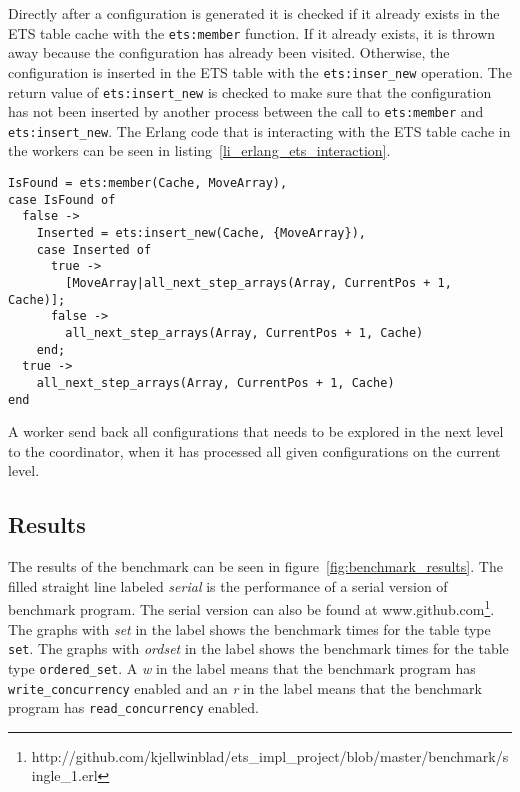 \documentclass[aps,pre,preprint,nofootinbib]{revtex4}
\begin{document}
    Directly after a configuration is generated it is checked if it already exists in the ETS table cache with the \verb|ets:member| function.
    If it already exists, it is thrown away because the configuration has already been visited.
    Otherwise, the configuration is inserted in the ETS table with the \verb|ets:inser_new| operation.
    The return value of \verb|ets:insert_new| is checked to make sure that the configuration has not been inserted by another process between the call to \verb|ets:member| and \verb|ets:insert_new|.
    The Erlang code that is interacting with the ETS table cache in the workers can be seen in listing~\ref{li_erlang_ets_interaction}.

    \lstset{language=erlang, caption=Worker code that is interacting with ETS, label=li_erlang_ets_interaction} 
\begin{lstlisting}[float=htb] 
IsFound = ets:member(Cache, MoveArray),
case IsFound of
  false ->
    Inserted = ets:insert_new(Cache, {MoveArray}),
    case Inserted of
      true ->
        [MoveArray|all_next_step_arrays(Array, CurrentPos + 1, Cache)];
      false ->
        all_next_step_arrays(Array, CurrentPos + 1, Cache)
    end;
  true ->
    all_next_step_arrays(Array, CurrentPos + 1, Cache)
end
\end{lstlisting}
    
    A worker send back all configurations that needs to be explored in the next level to the coordinator, when it has processed all given configurations on the current level.


\subsection{Results}

  The results of the benchmark can be seen in figure~\ref{fig:benchmark_results}.
  The filled straight line labeled \emph{serial} is the performance of a serial version of benchmark program.
  The serial version can also be found at www.github.com\footnote{http://github.com/kjellwinblad/ets\_impl\_project/blob/master/benchmark/single\_1.erl}.
  The graphs with \emph{set} in the label shows the benchmark times for the table type \verb|set|.
  The graphs with \emph{ordset} in the label shows the benchmark times for the table type \verb|ordered_set|.
  A \emph{w} in the label means that the benchmark program has \verb|write_concurrency| enabled and an \emph{r} in the label means that the benchmark program has \verb|read_concurrency| enabled.
  
\end{document}
